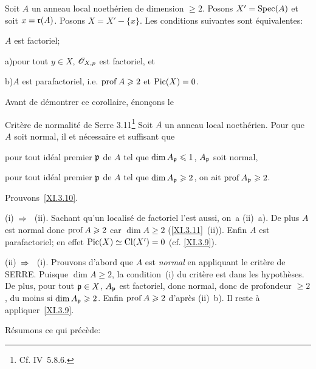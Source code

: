 \begin{corollaire} \label{XI.3.10}
Soit $A$ un anneau local noeth\'erien de dimension $\geq 2$. Posons $X'=\operatorname{Spec}(A)$ et soit $x = \mathfrak{r}(A)$. Posons $X=X'-\{x\}$. Les conditions suivantes sont \'equivalentes:
\begin{enumeratei}
\item
$A$ est factoriel;
\item
\textup{a)}\enspace pour tout $y\in X$, ${\mathscr O}_{X, p}$ est factoriel, et
\par\hspace*{6.3mm}\textup{b)}\enspace $A$ est parafactoriel, i.e. $\operatorname{prof} A\geqslant 2$ et $\operatorname{Pic}(X)=0$.
\end{enumeratei}
\end{corollaire}

Avant de d\'emontrer ce corollaire, \'enon\c cons le
\label{XI.3.11}
\begin{enonce*}{Crit\`ere de normalit\'e de Serre 3.11\footnote{Cf. \EGA IV~5.8.6.}} Soit $A$ un anneau local noeth\'erien. Pour que $A$ soit normal, il et n\'ecessaire et suffisant que
\begin{enumeratei}
\item
pour tout id\'eal premier ${\mathfrak{p}}$ de $A$ tel que $\dim A_{{\mathfrak{p}}}\leqslant 1$, $A_{{\mathfrak{p}}}$ soit normal,
\item
pour tout id\'eal premier ${\mathfrak{p}}$ de $A$ tel que $\dim A_{{\mathfrak{p}}}\geqslant 2$, on ait $\operatorname{prof} A_{{\mathfrak{p}}}\geqslant 2$.
\end{enumeratei}
\end{enonce*}

Prouvons~\ref{XI.3.10}.

(i)~$\To$~ (ii). Sachant qu'un localis\'e de factoriel l'est aussi, on~a (ii)~a). De plus $A$ est normal donc $\operatorname{prof} A\geqslant 2$ car $\dim A\geq 2$ (\ref{XI.3.11}~(ii)). Enfin $A$ est parafactoriel; en effet $\operatorname{Pic}(X)\simeq\operatorname{Cl}(X')=0$ (cf. \ref{XI.3.9}).

(ii)~$\To$~ (i). Prouvons d'abord que $A$ est \emph{normal} en appliquant le crit\`ere de SERRE. Puisque $\dim A\geq 2$, la condition~(i) du crit\`ere est dans les hypoth\`eses. De plus, pour tout ${\mathfrak{p}}\in X$, $A_{{\mathfrak{p}}}$ est factoriel, donc normal, donc de profondeur $\geq 2$, du moins si $\dim A_{{\mathfrak{p}}}\geqslant 2$. Enfin $\operatorname{prof} A\geqslant 2$ d'apr\`es (ii)~b). Il reste \`a appliquer~\ref{XI.3.9}.

\smallskip
R\'esumons ce qui pr\'ec\`ede:

